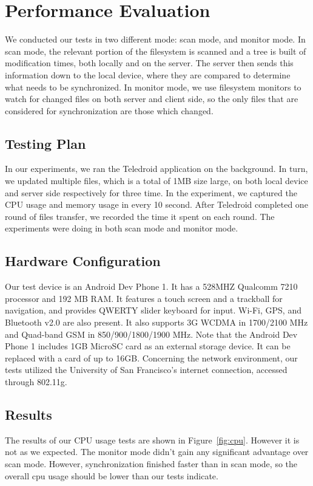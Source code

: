\section{Performance Evaluation}
\label{sec:Performance}

We conducted our tests in two different mode: scan mode, and monitor mode. In scan mode, the relevant portion of the filesystem is scanned and a tree is built of modification times, both locally and on the server.  The server then sends this information down to the local device, where they are compared to determine what needs to be synchronized. In monitor mode, we use filesystem monitors to watch for changed files on both server and client side, so the only files that are considered for synchronization are those which changed. 


\subsection{Testing Plan}
In our experiments, we ran the Teledroid application on the background. In turn, we updated multiple files, which is a total of 1MB size large, on both local device and server side respectively for three time. In the experiment, we captured the CPU usage and memory usage in every 10 second. After Teledroid completed one round of files transfer, we recorded the time it spent on each round. The experiments were doing in both scan mode and monitor mode.
				
\subsection{Hardware Configuration}
Our test device is an Android Dev Phone 1. It has a 528MHZ Qualcomm 7210 processor and 192 MB RAM. It features a touch screen and a trackball for navigation, and provides QWERTY slider keyboard for input. Wi-Fi, GPS, and Bluetooth v2.0 are also present. It also supports 3G WCDMA in 1700/2100 MHz and Quad-band GSM in 850/900/1800/1900 MHz. Note that the Android Dev Phone 1 includes 1GB MicroSC card as an external storage device. It can be replaced with a card of up to 16GB. Concerning the network environment, our tests utilized the University of San Francisco's internet connection, accessed through 802.11g.

\subsection{Results}
The results of our CPU usage tests are shown in Figure~\ref{fig:cpu}. However it is not as we expected. The monitor mode didn't gain any significant advantage over scan mode. However, synchronization finished faster than in scan mode, so the overall cpu usage should be lower than our tests indicate.

